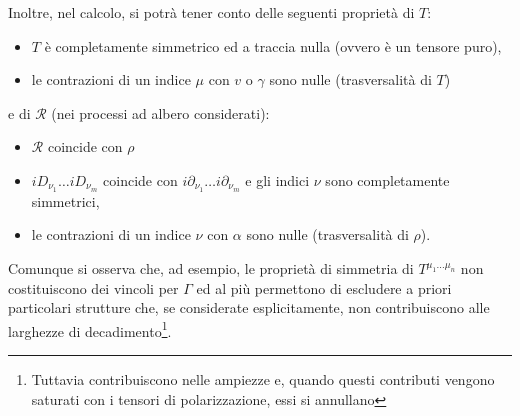 \documentclass{article}
\begin{document}
Inoltre, nel calcolo, si potrà tener conto delle seguenti proprietà di $T$:
\begin{itemize}
  \item $T$ è completamente simmetrico ed a traccia nulla (ovvero è un tensore puro), 
  \item le contrazioni di un indice $\mu$ con $v$ o $\gamma$ sono nulle (trasversalità di $T$)
\end{itemize}
e di $\mathcal{R}$ (nei processi ad albero considerati):
\begin{itemize}
  \item $\mathcal{R}$ coincide con $\rho$
  \item $i D_{\nu_1} \dots i D_{\nu_m}$ coincide con $i \partial_{\nu_1} \dots i \partial_{\nu_m}$ e gli indici $\nu$ sono completamente simmetrici,
  \item le contrazioni di un indice $\nu$ con $\alpha$ sono nulle (trasversalità di $\rho$).
\end{itemize}
Comunque si osserva che, ad esempio, le proprietà di simmetria di $T^{\mu_1 \dots \mu_n}$ non costituiscono dei vincoli per $\Gamma$ ed al più permettono di escludere a priori particolari strutture che, se considerate esplicitamente, non contribuiscono alle larghezze di decadimento\footnote{Tuttavia contribuiscono nelle ampiezze e, quando questi contributi vengono saturati con i tensori di polarizzazione, essi si annullano}.
\end{document}
